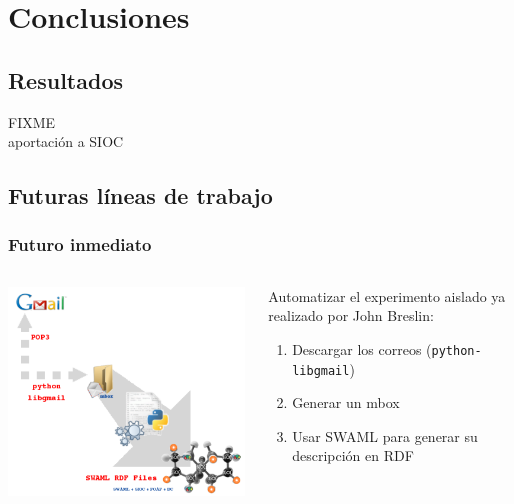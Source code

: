 \documentclass[spanish,notes=hide]{beamer}
\begin{document}
\section{Conclusiones}
\subsection{Resultados}
\frame
{
  FIXME\\
  aportación a SIOC
}
\subsection{Futuras líneas de trabajo}
\frame
{
  \frametitle{Futuro inmediato}


  \bigskip
  \begin{columns}
   \begin{column}{0.7\textwidth}
    \includegraphics[width=0.99\textwidth]{images/gmail-swaml.png}
   \end{column}
   \begin{column}{0.4\textwidth}
    Automatizar el experimento aislado ya realizado por John Breslin:
    \begin{enumerate}
     \item Descargar los correos (\texttt{python-libgmail})
     \item Generar un mbox
     \item Usar SWAML para generar su descripción en RDF
    \end{enumerate}
   \end{column}
  \end{columns}
  \bigskip
}
\end{document}
